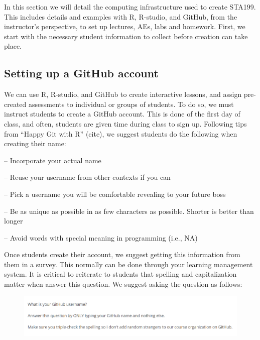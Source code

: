 \documentclass[
  12pt]{article}
\begin{document}
In this section we will detail the computing infrastructure used to
create STA199. This includes details and examples with R, R-studio, and
GitHub, from the instructor's perspective, to set up lectures, AEs, labs
and homework. First, we start with the necessary student information to
collect before creation can take place.

\hypertarget{setting-up-a-github-account}{%
\subsection{Setting up a GitHub
account}\label{setting-up-a-github-account}}

We can use R, R-studio, and GitHub to create interactive lessons, and
assign pre-created assessments to individual or groups of students. To
do so, we must instruct students to create a GitHub account. This is
done of the first day of class, and often, students are given time
during class to sign up. Following tips from ``Happy Git with R''
(cite), we suggest students do the following when creating their name:

-- Incorporate your actual name

-- Reuse your username from other contexts if you can

-- Pick a username you will be comfortable revealing to your future boss

-- Be as unique as possible in as few characters as possible. Shorter is
better than longer

-- Avoid words with special meaning in programming (i.e., NA)

Once students create their account, we suggest getting this information
from them in a survey. This normally can be done through your learning
management system. It is critical to reiterate to students that spelling
and capitalization matter when answer this question. We suggest asking
the question as follows:

\begin{figure}

{\centering \includegraphics{images/github.question.png}

}

\end{figure}
\end{document}
